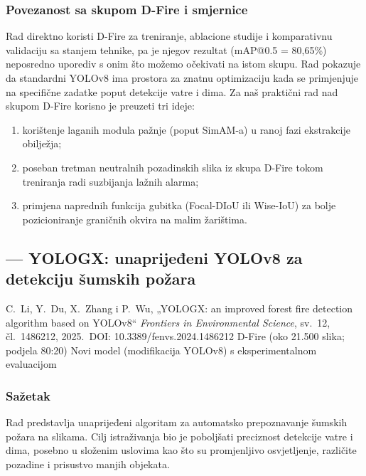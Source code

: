 \subsubsection{Povezanost sa skupom D-Fire i smjernice}
Rad direktno koristi D-Fire za treniranje, ablacione studije i komparativnu validaciju sa stanjem tehnike, pa je njegov rezultat (mAP@0.5 = 80,65\%) neposredno uporediv s onim što možemo očekivati na istom skupu. Rad pokazuje da standardni YOLOv8 ima prostora za znatnu optimizaciju kada se primjenjuje na specifične zadatke poput detekcije vatre i dima. Za naš praktični rad nad skupom D-Fire korisno je preuzeti tri ideje:
\begin{enumerate}
  \item korištenje laganih modula pažnje (poput SimAM-a) u ranoj fazi ekstrakcije obilježja;
  \item poseban tretman neutralnih pozadinskih slika iz skupa D-Fire tokom treniranja radi suzbijanja lažnih alarma;
  \item primjena naprednih funkcija gubitka (Focal-DIoU ili Wise-IoU) za bolje pozicioniranje graničnih okvira na malim žarištima.
\end{enumerate}

\clearpage
\subsection{\texorpdfstring{\AutorF}{Adnan Šemić} --- YOLOGX: unaprijeđeni YOLOv8 za detekciju šumskih požara}

\paperbox{\AutorF}
  {C.\ Li, Y.\ Du, X.\ Zhang i P.\ Wu, „YOLOGX: an improved forest fire detection algorithm based on YOLOv8“ \cite{liyologx}}
  {\emph{Frontiers in Environmental Science}, sv.\ 12, čl.\ 1486212, 2025.\ DOI: 10.3389/fenvs.2024.1486212}
  {D-Fire (oko 21.500 slika; podjela 80:20)}
  {Novi model (modifikacija YOLOv8) s eksperimentalnom evaluacijom}

\subsubsection{Sažetak}
Rad predstavlja unaprijeđeni algoritam za automatsko prepoznavanje šumskih požara na slikama. Cilj istraživanja bio je poboljšati preciznost detekcije vatre i dima, posebno u složenim uslovima kao što su promjenljivo osvjetljenje, različite pozadine i prisustvo manjih objekata.

